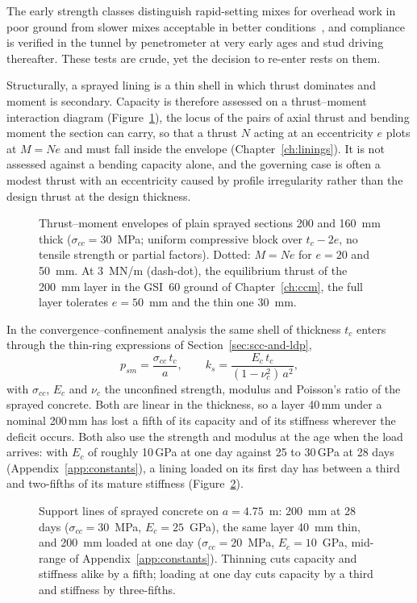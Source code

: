 The early strength classes distinguish rapid-setting mixes for overhead work
in poor ground from slower mixes acceptable in better conditions~\citep{thomas2009scl}, and
compliance is verified in the tunnel by penetrometer at very early ages and
stud driving thereafter. These tests are crude, yet the decision to re-enter
rests on them.

Structurally, a sprayed lining is a thin shell in which thrust dominates and
moment is secondary. Capacity is therefore assessed on a thrust--moment
interaction diagram (Figure~\ref{fig:shotcrete-interaction}), the locus of the pairs of axial thrust and bending
moment the section can carry, so that a thrust $N$ acting at an eccentricity
$e$ plots at $M = Ne$ and must fall inside the envelope
(Chapter~\ref{ch:linings}). It is not assessed against a bending capacity
alone, and the
governing case is often a modest thrust with an eccentricity caused by
profile irregularity rather than the design thrust at the design thickness.

\begin{figure}[htbp]
\centering
{}
\caption{Thrust--moment envelopes of plain sprayed sections 200 and 160~mm thick ($\sigma_{cc} = 30$~MPa; uniform compressive block over $t_c - 2e$, no tensile strength or partial factors). Dotted: $M = Ne$ for $e = 20$ and 50~mm. At 3~MN/m (dash-dot), the equilibrium thrust of the 200~mm layer in the GSI~60 ground of Chapter~\ref{ch:ccm}, the full layer tolerates $e = 50$~mm and the thin one 30~mm.}
\label{fig:shotcrete-interaction}
\end{figure}

In the convergence--confinement analysis the same shell of thickness $t_c$
enters through the thin-ring expressions of Section~\ref{sec:scc-and-ldp},
\[
p_{sm} = \frac{\sigma_{cc}\, t_c}{a}, \qquad
k_s = \frac{E_c\, t_c}{(1-\nu_c^2)\,a^2},
\]
with $\sigma_{cc}$, $E_c$ and $\nu_c$ the unconfined strength, modulus and
Poisson's ratio of the sprayed concrete. Both are linear in the thickness, so
a layer 40\,mm under a nominal 200\,mm has lost a fifth of its capacity and
of its stiffness wherever the deficit occurs. Both also use the strength and
modulus at the age when the load arrives: with $E_c$ of roughly 10\,GPa at one
day against 25 to 30\,GPa at 28 days (Appendix~\ref{app:constants}), a lining
loaded on its first day has between a third and two-fifths of its mature
stiffness (Figure~\ref{fig:shotcrete-scc-age}).

\begin{figure}[htbp]
\centering
{}
\caption{Support lines of sprayed concrete on $a = 4.75$~m: 200~mm at 28 days ($\sigma_{cc} = 30$~MPa, $E_c = 25$~GPa), the same layer 40~mm thin, and 200~mm loaded at one day ($\sigma_{cc} = 20$~MPa, $E_c = 10$~GPa, mid-range of Appendix~\ref{app:constants}). Thinning cuts capacity and stiffness alike by a fifth; loading at one day cuts capacity by a third and stiffness by three-fifths.}
\label{fig:shotcrete-scc-age}
\end{figure}

